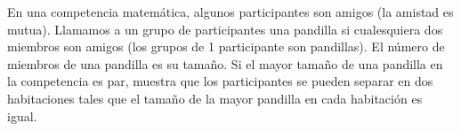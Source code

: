 En una competencia matemática, algunos participantes son amigos (la amistad es mutua). Llamamos a un grupo de participantes una pandilla si cualesquiera dos miembros son amigos (los grupos de 1 participante son pandillas). El número de miembros de una pandilla es su tamaño.  \newline 
Si el mayor tamaño de una pandilla en la competencia es par, muestra que los participantes se pueden separar en dos habitaciones tales que el tamaño de la mayor pandilla en cada habitación es igual.